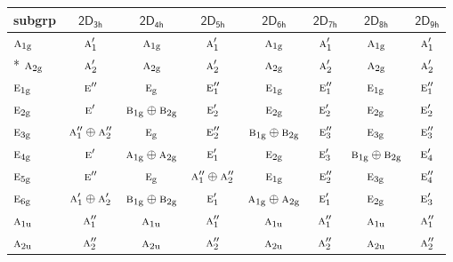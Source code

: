 \documentclass[10pt,a4paper]{article}
\numberwithin{equation}{section}
\newcommand{\grp}[1]{\mathsf{#1}}
\newcommand{\irr}[1]{\text{\normalfont\scshape #1}}
\newcommand{\ptag}[1]{\mathrm{#1}}
\begin{document}
{\small\begin{longtable}{@{}lccccccc@{}}\toprule
subgrp & \href{2D3h.pdf}{$\grp{2D_{3h}}$} & \href{2D4h.pdf}{$\grp{2D_{4h}}$} & \href{2D5h.pdf}{$\grp{2D_{5h}}$} & \href{2D6h.pdf}{$\grp{2D_{6h}}$} & \href{2D7h.pdf}{$\grp{2D_{7h}}$} & \href{2D8h.pdf}{$\grp{2D_{8h}}$} & \href{2D9h.pdf}{$\grp{2D_{9h}}$}\\\midrule\endhead
\bottomrule\endfoot\endlastfoot
$\irr{a}_{1\ptag{g}}$ & $\irr{a}_{1}'$ & $\irr{a}_{1\ptag{g}}$ & $\irr{a}_{1}'$ & $\irr{a}_{1\ptag{g}}$ & $\irr{a}_{1}'$ & $\irr{a}_{1\ptag{g}}$ & $\irr{a}_{1}'$\\*
$\irr{a}_{2\ptag{g}}$ & $\irr{a}_{2}'$ & $\irr{a}_{2\ptag{g}}$ & $\irr{a}_{2}'$ & $\irr{a}_{2\ptag{g}}$ & $\irr{a}_{2}'$ & $\irr{a}_{2\ptag{g}}$ & $\irr{a}_{2}'$\\
$\irr{e}_{1\ptag{g}}$ & $\irr{e}''$ & $\irr{e}_{\ptag{g}}$ & $\irr{e}_{1}''$ & $\irr{e}_{1\ptag{g}}$ & $\irr{e}_{1}''$ & $\irr{e}_{1\ptag{g}}$ & $\irr{e}_{1}''$\\
$\irr{e}_{2\ptag{g}}$ & $\irr{e}'$ & $\irr{b}_{1\ptag{g}}\oplus \irr{b}_{2\ptag{g}}$ & $\irr{e}_{2}'$ & $\irr{e}_{2\ptag{g}}$ & $\irr{e}_{2}'$ & $\irr{e}_{2\ptag{g}}$ & $\irr{e}_{2}'$\\
$\irr{e}_{3\ptag{g}}$ & $\irr{a}_{1}''\oplus \irr{a}_{2}''$ & $\irr{e}_{\ptag{g}}$ & $\irr{e}_{2}''$ & $\irr{b}_{1\ptag{g}}\oplus \irr{b}_{2\ptag{g}}$ & $\irr{e}_{3}''$ & $\irr{e}_{3\ptag{g}}$ & $\irr{e}_{3}''$\\
$\irr{e}_{4\ptag{g}}$ & $\irr{e}'$ & $\irr{a}_{1\ptag{g}}\oplus \irr{a}_{2\ptag{g}}$ & $\irr{e}_{1}'$ & $\irr{e}_{2\ptag{g}}$ & $\irr{e}_{3}'$ & $\irr{b}_{1\ptag{g}}\oplus \irr{b}_{2\ptag{g}}$ & $\irr{e}_{4}'$\\
$\irr{e}_{5\ptag{g}}$ & $\irr{e}''$ & $\irr{e}_{\ptag{g}}$ & $\irr{a}_{1}''\oplus \irr{a}_{2}''$ & $\irr{e}_{1\ptag{g}}$ & $\irr{e}_{2}''$ & $\irr{e}_{3\ptag{g}}$ & $\irr{e}_{4}''$\\
$\irr{e}_{6\ptag{g}}$ & $\irr{a}_{1}'\oplus \irr{a}_{2}'$ & $\irr{b}_{1\ptag{g}}\oplus \irr{b}_{2\ptag{g}}$ & $\irr{e}_{1}'$ & $\irr{a}_{1\ptag{g}}\oplus \irr{a}_{2\ptag{g}}$ & $\irr{e}_{1}'$ & $\irr{e}_{2\ptag{g}}$ & $\irr{e}_{3}'$\\
$\irr{a}_{1\ptag{u}}$ & $\irr{a}_{1}''$ & $\irr{a}_{1\ptag{u}}$ & $\irr{a}_{1}''$ & $\irr{a}_{1\ptag{u}}$ & $\irr{a}_{1}''$ & $\irr{a}_{1\ptag{u}}$ & $\irr{a}_{1}''$\\
$\irr{a}_{2\ptag{u}}$ & $\irr{a}_{2}''$ & $\irr{a}_{2\ptag{u}}$ & $\irr{a}_{2}''$ & $\irr{a}_{2\ptag{u}}$ & $\irr{a}_{2}''$ & $\irr{a}_{2\ptag{u}}$ & $\irr{a}_{2}''$\\

\end{longtable}}
\end{document}
